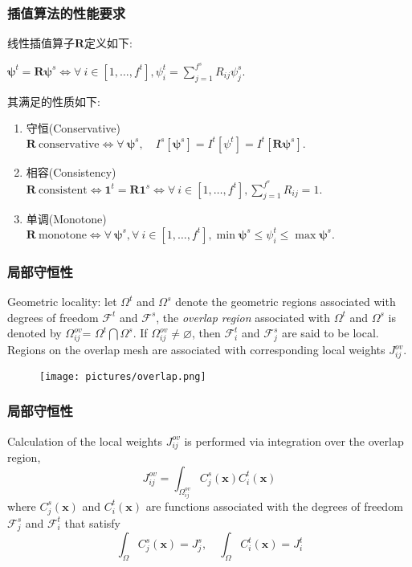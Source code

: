 \documentclass[unknownkeysallowed]{beamer}
\newcommand{\vb}{\mathbf}
\newcommand{\vg}{\boldsymbol}
\begin{document}
\begin{spacing}{1.2}
\begin{frame}
\frametitle{插值算法的性能要求}
线性插值算子$\vb{R}$定义如下:
  \centerline{$\vg{\psi}^t = \mathbf{R} \vg{\psi}^s \Longleftrightarrow \forall\ i \in [1, \ldots, f^t], \psi_i^t=\displaystyle{\sum_{j=1}^{f^s}}R_{i j} \psi_j^s.$}
  \pause
其满足的性质如下:
\begin{enumerate}
\pause
\item \textcolor[rgb]{0,0,1}{守恒(Conservative)} \\
$\vb{R}\ \mbox{conservative} \Longleftrightarrow  \forall\ \vg{\psi}^s, \quad I^s[\vg{\psi}^s] = I^t[{\psi}^t]=I^t[\vb{R} \vg{\psi}^s].$
\pause
\item \textcolor[rgb]{0,0,1}{相容(Consistency)}\\
$\vb{R}\ \mbox{consistent} \Longleftrightarrow  \vg{1}^t = \vb{R} \vg{1}^s \Longleftrightarrow \forall\ i \in [1, \ldots, f^t], \displaystyle{\sum_{j=1}^{f^s}}R_{i j} = 1.$
\pause
\item \textcolor[rgb]{0,0,1}{单调(Monotone)}\\
$\vb{R}\ \mbox{monotone} \Longleftrightarrow \forall\ \vg{\psi}^s, \forall\ i \in [1, \ldots, f^t], \min \vg{\psi}^s \leq \psi^t_i \leq \max \vg{\psi}^s.$
\end{enumerate}
\end{frame}



\begin{frame}
\frametitle{局部守恒性}
\textcolor[rgb]{0,0,1}{Geometric locality}: let $\Omega^t$ and $\Omega^s$ denote the geometric regions associated with degrees of freedom  $\mathscr{F}^t$ and $\mathscr{F}^s$, the \textit{overlap region} associated with  $\Omega^t$ and $\Omega^s$ is denoted by  $\Omega^{ov}_{ij}$=  $\Omega^t \bigcap \Omega^s$. If  $\Omega^{ov}_{ij}\neq \varnothing$, then $\mathscr{F}_i^t$ and $\mathscr{F}_j^s$ are said to be \textcolor[rgb]{1,0,0}{local}. Regions on the overlap mesh are associated with corresponding local weights  $J^{ov}_{ij}$.
\begin{figure}[c]
\texttt{[image: pictures/overlap.png]}
\end{figure}
\end{frame}

\begin{frame}
\frametitle{局部守恒性}
Calculation of the local weights $J^{ov}_{ij}$ is performed via integration over the overlap region,
$$J^{ov}_{ij}=\int_{\Omega_{ij}^{ov}}C_j^s(\vb{x})C_i^t(\vb{x})$$
where $C_j^s(\vb{x})$ and $C_i^t(\vb{x})$ are functions associated with the degrees of freedom $\mathscr{F}_j^s$ and $\mathscr{F}_i^t$ that satisfy
$$\int_{\Omega}C_j^s(\vb{x})=J_j^s, \quad \int_{\Omega}C_i^t(\vb{x})=J_i^t$$


\end{frame}
\end{spacing}
\end{document}
